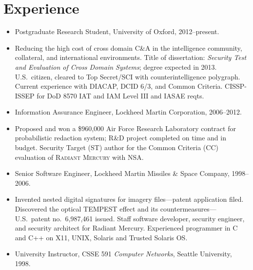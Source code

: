 \documentclass[12pt,twoside,letterpaper]{article}
\newenvironment{myquote}{\list{}{\leftmargin=0.25in\rightmargin=0in}\item[]}{\endlist}
\begin{document}
\section*{Experience}
\vspace{-2mm}
\begin{itemize}
	\item Postgraduate Research Student, University of Oxford, 2012--present.
		\vspace{-2mm}
		\begin{myquote}
			Reducing the high cost of cross domain C\&A in the intelligence community,
			collateral, and international environments.  Title of dissertation:
			\emph{Security Test and Evaluation of Cross Domain Systems}; degree expected
			in 2013.
			U.S.\ citizen, cleared to Top Secret/SCI with counterintelligence polygraph.
			Current experience with DIACAP, DCID 6/3, and Common Criteria.
			CISSP-ISSEP for DoD 8570 IAT and IAM Level III and IASAE reqts.
		\end{myquote}

\vspace{-2.5mm}
	\item Information Assurance Engineer, Lockheed Martin Corporation, 2006--2012.
		\vspace{-2mm}
		\begin{myquote}
			Proposed and won a \$960,000 Air Force Research Laboratory contract
			for probabilistic redaction system; R\&D project completed on time
			and in budget.  Security Target (ST) author for the Common Criteria (CC)
			evaluation of \textsc{Radiant Mercury} with NSA.
		\end{myquote}

\vspace{-2.5mm}
	\item Senior Software Engineer, Lockheed Martin Missiles \& Space Company, 1998--2006.
		\vspace{-2mm}
		\begin{myquote}
			Invented nested digital signatures for imagery files---patent application filed.
			Discovered the optical TEMPEST effect and its
			countermeasures---U.S.\ patent no.\ 6,987,461 issued.  Staff software developer,
			security engineer, and security architect for
			Radiant Mercury.  Experienced programmer in C and C++ on X11, UNIX, Solaris and
			Trusted Solaris OS.
		\end{myquote}
\vspace{-2.5mm}
    \item University Instructor, CSSE 591 \emph{Computer Networks}, Seattle University, 1998.
\end{itemize}
\end{document}
